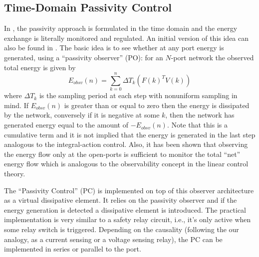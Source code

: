 \subsection{Time-Domain Passivity Control}
In \cite{hannafordryu}, the passivity approach is formulated in the time domain and the energy exchange is literally
monitored and regulated. An initial version of this idea can also be found in \cite{yokokohji}. The basic idea is 
to see whether at any port energy is generated, using a \enquote{passivity observer} (PO): for an $N$-port 
network the observed total energy is given by
\[
E_{obsv}(n) = \sum_{k=0}^n \Delta T_k(F(k)^TV(k))
\]
where $\Delta T_k$ is the sampling period at each step with nonuniform sampling in mind. If 
$E_{obsv}(n) $ is greater than or equal to zero then the energy is dissipated by the network, conversely if
it is negative at some $k$, then the network has generated energy equal to the amount of $-E_{obsv}(n)$. Note that
this is a cumulative term and it is not implied that the energy is generated in the last step analogous to the 
integral-action control. Also, it has been shown that observing the energy flow only at the open-ports is 
sufficient to monitor the total \enquote{net} energy flow which is analogous to the observability concept in the 
linear control theory. 

The \enquote{Passivity Control} (PC) is implemented on top of this observer architecture as a virtual dissipative 
element. It relies on the passivity observer and if the energy generation is detected a dissipative element is 
introduced. The practical implementation is very similar to a safety relay circuit, i.e., it's only active when 
some relay switch is triggered. Depending on the causality (following the our analogy, as a current sensing or a 
voltage sensing relay), the PC can be implemented in series or parallel to the port. 

